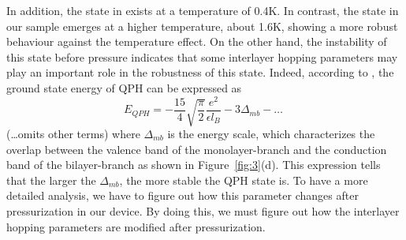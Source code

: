 In addition, the state in \cite{stepanov2019quantum} exists at a temperature of 0.4K. In contrast, the state in our sample emerges at a higher temperature, about 1.6K, 
showing a more robust behaviour against the temperature effect. On the other hand, the instability of this state before pressure indicates that some interlayer hopping parameters may play an important role in the robustness of this state. 
Indeed, according to \cite{stepanov2019quantum}, the ground state energy of QPH can be expressed as 
\begin{equation}
    E_{QPH}=-\frac{15}{4}\sqrt{\frac{\pi}{2}}\frac{e^2}{\epsilon l_B}-3\Delta_{mb}-\ldots \; \label{eq:qhe_ene}
\end{equation}
(\ldots omits other terms) 
where $Δ_{mb}$ is the energy scale, which characterizes the overlap between the valence band of the monolayer-branch and the conduction band of the bilayer-branch as shown in Figure~\ref{fig:3}(d). 
This expression tells that the larger the $Δ_{mb}$, the more stable the QPH state is. 
To have a more detailed analysis, we have to figure out how this parameter changes after pressurization in our device. 
By doing this, we must figure out how the interlayer hopping parameters are modified after pressurization.